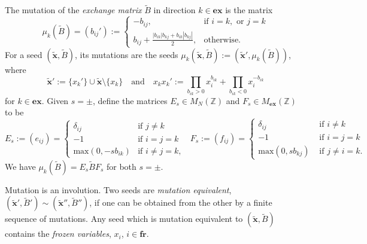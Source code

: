 \documentclass[11pt]{amsart}
\theoremstyle{plain}
\def \Zset {{\mathbb Z}}
\def \B  {{\widetilde{B}}}
\newcommand \ex {{\mathbf{ex}}}
\newcommand \fr {{\mathbf{fr}}}
\def \x {{\wt{\mathbf{x}}}} %
\def \wt {\widetilde}
\renewcommand \max { {\mathrm{max}} }
\begin{document}
The mutation of the {\em{exchange matrix}} $\B$ in direction $k \in \ex$ is the matrix 
\begin{equation}
\label{mutation}
\mu_k(\B) = (b_{ij}'):=
\begin{cases}
-b_{ij}, & \text{if } i = k, \text{ or } j=k \\
b_{ij} + \frac{|b_{ik}|b_{kj} + b_{ik}|b_{kj}|}{2}, & \text{otherwise.}
\end{cases}
\end{equation}
For a seed $(\x, \B)$, its mutations are the seeds $\mu_k (\x, \B) := (\x', \mu_k(\B))$, where 
\[
\x' := \{x_k'\} \cup \x \setminus \{x_k\} 
\quad
\mbox{and}
\quad
x_k x_k' := \prod_{b_{ik}>0}x_i^{b_{ik}} + \prod_{b_{ik}<0}x_i^{-b_{ik}}
\]
for $k \in \ex$. Given $s = \pm$, define the matrices $E_s \in M_N(\Zset)$ and $F_s \in M_\ex(\Zset)$ to be
\[
E_s := (e_{ij}) =
\begin{cases}
\delta_{ij} &  \text{if } j \neq k \\
-1 & \text{if } i = j = k \\
\max(0,-sb_{ik}) & \text{if } i \neq j = k,
\end{cases} \; \; 
F_s := (f_{ij})=
\begin{cases}
\delta_{ij} &  \text{ if } i \neq k \\
-1 & \text{ if } i = j = k \\
\max(0,sb_{kj}) & \text{ if } j \neq i = k.
\end{cases}
\]
We have $\mu_k(\B)= E_s \B F_s$ for both $s = \pm$.

Mutation is an involution. Two seeds are {\em{mutation equivalent}}, $(\x', \B')\sim (\x'', \B'')$, if one can be obtained from the other by a finite sequence of mutations.
Any seed which is mutation equivalent to $(\x, \B)$ contains the {\em{frozen variables}}, $x_i$, $i \in \fr$. 
\end{document}
